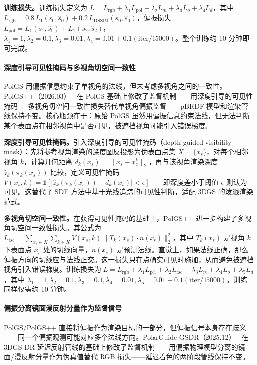\textbf{训练损失。}训练损失定义为 $L = L_\text{rgb} + \lambda_1 L_\text{pol} + \lambda_2 L_m + \lambda_3 L_o + \lambda_4 L_d$，其中 $L_\text{rgb} = 0.8\, L_1(s_0, \hat{s}_0) + 0.2\, L_\text{DSSIM}(s_0, \hat{s}_0)$，偏振损失 $L_\text{pol} = L_1(s_1, \hat{s}_1) + L_1(s_2, \hat{s}_2)$，$\lambda_1{=}1, \lambda_2{=}0.1, \lambda_3{=}0.01, \lambda_4{=}0.01{+}0.1(\text{iter}/15000)$。整个训练约 10 分钟即可完成。

\paragraph{深度引导可见性掩码与多视角切空间一致性}

PolGS 用偏振信息约束了单视角的法线，但未考虑多视角之间的一致性。PolGS++（2026.03）~\cite{2603_10801} 在 PolGS 基础上修改了监督机制——用深度引导的可见性掩码 + 多视角切空间一致性损失替代单视角偏振监督——pBRDF 模型和渲染管线保持不变。核心瓶颈在于：原始 PolGS 虽然用偏振信息约束法线，但无法判断某个表面点在相邻视角中是否可见，被遮挡视角可能引入错误梯度。

\textbf{深度引导可见性掩码。}引入深度引导的可见性掩码（depth-guided visibility mask）：先将参考视角渲染的深度图反投影为伪表面点集 $X = \{x_s\}$，对每个相邻视角 $k$，计算几何距离 $d_k(x_s) = \|x_s - x_c^k\|_2$，再与该视角渲染深度 $\hat{z}_k(\pi_k(x_s))$ 比较，定义可见性掩码 $V(x_s, k) = \mathbb{1}[|\hat{z}_k(\pi_k(x_s)) - d_k(x_s)| < \epsilon]$——即深度差小于阈值 $\epsilon$ 则认为可见。这替代了 SDF 方法中基于光线追踪的可见性判断，适配 3DGS 的泼溅渲染范式。

\textbf{多视角切空间一致性。}在获得可见性掩码的基础上，PolGS++ 进一步构建了多视角切空间一致性损失。其公式为 $L_\text{tsc} = \sum_{x_s \in X} \sum_{k \in K} V(x_s, k) \, \|T_k(x_s) \cdot n(x_s)\|_2^2$，其中 $T_k(x_s)$ 是视角 $k$ 下表面点 $x_s$ 处的切线向量，$n(x_s)$ 是预测法线。直觉上，如果法线正确，那么偏振方向的切线应与法线正交。这一损失只在点确实可见时施加，从而避免被遮挡视角引入错误梯度。训练损失为 $L = L_\text{rgb} + \lambda_1 L_\text{pol} + \lambda_2 L_\text{tsc} + \lambda_3 L_m + \lambda_4 L_o + \lambda_5 L_d$，其中 $\lambda_1{=}1, \lambda_2{=}0.1, \lambda_3{=}0.1, \lambda_4{=}0.01, \lambda_5{=}0.01{+}0.1(\text{iter}/15000)$。训练同样仅需约 10 分钟。

\paragraph{偏振分离镜面漫反射分量作为监督信号}

PolGS/PolGS++ 直接将偏振作为渲染目标的一部分，但偏振信号本身存在歧义——同一个偏振观测可能对应多个法线方向。PolarGuide-GSDR（2025.12）~\cite{2512_02664} 在 3DGS-DR 延迟反射管线的基础上修改了监督机制——用偏振物理模型分离的镜面/漫反射分量作为伪真值替代 RGB 损失——延迟着色的两阶段管线保持不变。

